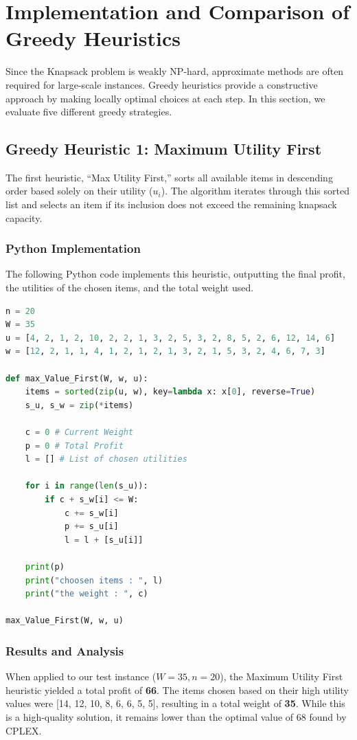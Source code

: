 \documentclass[11pt,a4paper]{article}
\begin{document}
\section{Implementation and Comparison of Greedy Heuristics}

Since the Knapsack problem is weakly NP-hard, approximate methods are often required for large-scale instances. Greedy heuristics provide a constructive approach by making locally optimal choices at each step. In this section, we evaluate five different greedy strategies.

\subsection{Greedy Heuristic 1: Maximum Utility First}
The first heuristic, ``Max Utility First,'' sorts all available items in descending order based solely on their utility ($u_i$). The algorithm iterates through this sorted list and selects an item if its inclusion does not exceed the remaining knapsack capacity.

\subsubsection*{Python Implementation}
The following Python code implements this heuristic, outputting the final profit, the utilities of the chosen items, and the total weight used.

\begin{lstlisting}[language=Python, caption=Max Utility First Heuristic]
n = 20
W = 35
u = [4, 2, 1, 2, 10, 2, 2, 1, 3, 2, 5, 3, 2, 8, 5, 2, 6, 12, 14, 6]
w = [12, 2, 1, 1, 4, 1, 2, 1, 2, 1, 3, 2, 1, 5, 3, 2, 4, 6, 7, 3]

def max_Value_First(W, w, u):
    items = sorted(zip(u, w), key=lambda x: x[0], reverse=True)
    s_u, s_w = zip(*items)
    
    c = 0 # Current Weight
    p = 0 # Total Profit
    l = [] # List of chosen utilities
    
    for i in range(len(s_u)):
        if c + s_w[i] <= W:
            c += s_w[i]
            p += s_u[i]
            l = l + [s_u[i]]
            
    print(p)
    print("choosen items : ", l)
    print("the weight : ", c)

max_Value_First(W, w, u)
\end{lstlisting}

\subsubsection*{Results and Analysis}
When applied to our test instance ($W=35, n=20$), the Maximum Utility First heuristic yielded a total profit of \textbf{66}. The items chosen based on their high utility values were [14, 12, 10, 8, 6, 6, 5, 5], resulting in a total weight of \textbf{35}. While this is a high-quality solution, it remains lower than the optimal value of 68 found by CPLEX.
\end{document}
